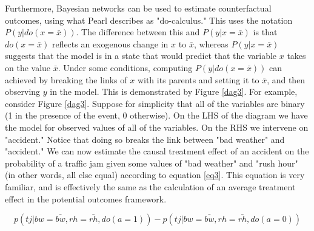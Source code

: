 \documentclass{article}
\begin{document}
Furthermore, Bayesian networks can be used to estimate counterfactual outcomes, using what Pearl \parencite{pearl2014probabilistic} describes as "do-calculus." This uses the notation $P(y|do(x=\bar{x}))$. The difference between this and $P(y|x=\bar{x})$ is that $do(x=\bar{x})$ reflects an exogenous change in $x$ to $\bar{x}$, whereas $P(y|x=\bar{x})$ suggests that the model is in a state that would predict that the variable $x$ takes on the value $\bar{x}$. Under some conditions, computing $P(y|do(x=\bar{x}))$ can achieved by breaking the links of $x$ with its parents and setting it to $\bar{x}$, and then observing $y$ in the model. This is demonstrated by Figure \ref{dag3}. For example, consider Figure \ref{dag3}. Suppose for simplicity that all of the variables are binary (1 in the presence of the event, 0 otherwise). On the LHS of the diagram we have the model for observed values of all of the variables. On the RHS we intervene on "accident." Notice that doing so breaks the link between "bad weather" and "accident." We can now estimate the causal treatment effect of an accident on the probability of a traffic jam given some values of "bad weather" and "rush hour" (in other words, all else equal) according to equation \ref{eq3}. This equation is very familiar, and is effectively the same as the calculation of an average treatment effect in the potential outcomes framework.

\begin{equation}
  \label{eq3}
  p(tj | bw = \bar{bw}, rh = \bar{rh}, do(a=1)) - p(tj | bw = \bar{bw}, rh = \bar{rh}, do(a=0))
\end{equation}
\end{document}
